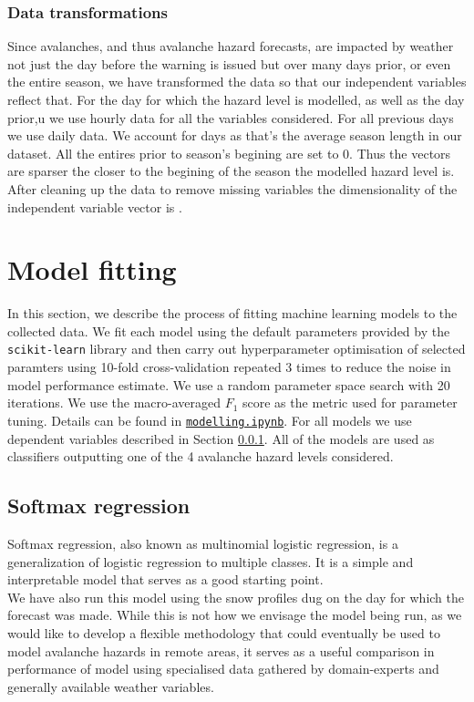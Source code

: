 \documentclass{article}
\begin{document}
\subsubsection{Data transformations}\label{sec:weather_data_trans}
	Since avalanches, and thus avalanche hazard forecasts, are impacted by weather not just the day before the warning is issued but over many days prior, or even the entire season, we have transformed the data so that our independent variables reflect that. For the day for which the hazard level is modelled, as well as the day prior,u we use hourly data for all the variables considered. For all previous days we use daily data. We account for days as that's the average season length in our dataset. All the entires prior to season's begining are set to 0. Thus the vectors are sparser the closer to the begining of the season the modelled hazard level is. After cleaning up the data to remove missing variables the dimensionality of the independent variable vector is \unskip.

\section{Model fitting}

	In this section, we describe the process of fitting machine learning models to the collected data. We fit each model using the default parameters provided by the \texttt{scikit-learn} library and then carry out hyperparameter optimisation of selected paramters using 10-fold cross-validation repeated 3 times to reduce the noise in model performance estimate. We use a random parameter space search with 20 iterations. We use the macro-averaged $F_1$ score as the metric used for parameter tuning. Details can be found in \href{https://github.com/witgaw/avalanche-danger-level-forecast/blob/project-report/src/modelling.ipynb}{\texttt{modelling.ipynb}}.
	For all models we use dependent variables described in Section \ref{sec:weather_data_trans}.
	All of the models are used as classifiers outputting one of the 4 avalanche hazard levels considered.

\subsection{Softmax regression}

	Softmax regression, also known as multinomial logistic regression, is a generalization of logistic regression to multiple classes. It is a simple and interpretable model that serves as a good starting point. \\
	We have also run this model using the snow profiles dug on the day for which the forecast was made. While this is not how we envisage the model being run, as we would like to develop a flexible methodology that could eventually be used to model avalanche hazards in remote areas, it serves as a useful comparison in performance of model using specialised data gathered by domain-experts and generally available weather variables.
\end{document}
